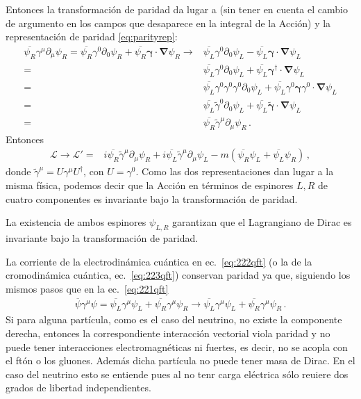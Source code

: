 Entonces la transformación de paridad da lugar a (sin tener en cuenta el cambio de argumento en los campos que desaparece en la integral de la Acción) y la representación de paridad \eqref{eq:parityrep}:
\begin{align}
  \overline{\psi_R}\gamma^\mu\partial_\mu\psi_R=\overline{\psi_R}\gamma^0\partial_0\psi_R+\overline{\psi_R}\boldsymbol{\gamma}\cdot\boldsymbol{\nabla}\psi_R 
\to&\overline{\psi_L}\gamma^0\partial_0\psi_L-\overline{\psi_L}\boldsymbol{\gamma}\cdot\boldsymbol{\nabla}\psi_L\nonumber\\
=&\overline{\psi_L}\gamma^0\partial_0\psi_L+\overline{\psi_L}\boldsymbol{\gamma}^\dagger\cdot\boldsymbol{\nabla}\psi_L\nonumber\\
=&\overline{\psi_L}\gamma^0\gamma^0\gamma^0\partial_0\psi_L+\overline{\psi_L}\gamma^0\boldsymbol{\gamma}\gamma^0\cdot\boldsymbol{\nabla}\psi_L\nonumber\\
=&\overline{\psi_L}\tilde\gamma^0\partial_0\psi_L+\overline{\psi_L}\tilde{\boldsymbol{\gamma}}\cdot\boldsymbol{\nabla}\psi_L\nonumber\\
=&\overline{\psi_R}\tilde\gamma^\mu\partial_\mu\psi_R\,.
\end{align}
Entonces
\begin{align}
   \mathcal{L}\to\mathcal{L}'=&i\overline{\psi_R}\tilde\gamma^\mu\partial_\mu\psi_R+i\overline{\psi_L}\tilde\gamma^\mu\partial_\mu\psi_L-m(\overline{\psi_R}\psi_L+\overline{\psi_L}\psi_R)\,,
\end{align}
donde $\tilde\gamma^\mu=U\gamma^\mu U^\dagger$, con $U=\gamma^0$. Como las dos representaciones dan lugar a la misma física, podemos decir que la Acción en términos de espinores $L,R$ de cuatro componentes es invariante bajo la transformación de paridad.

La existencia de ambos espinores $\psi_{L,R}$ garantizan que el Lagrangiano de Dirac es invariante bajo la transformación de paridad. 

La corriente de la electrodinámica cuántica en ec.~\eqref{eq:222qft} (o la de la cromodinámica cuántica, ec.~\eqref{eq:223qft}) conservan paridad ya que, siguiendo los mismos pasos que en la ec.~\eqref{eq:221qft}
\begin{align}
  \label{eq:224qft}
  \overline{\psi}\gamma^\mu\psi=\overline{\psi_L}\gamma^\mu\psi_L+\overline{\psi_R}\gamma^\mu\psi_R\to\overline{\psi_L}\gamma^\mu\psi_L+\overline{\psi_R}\gamma^\mu\psi_R\,.
\end{align}
Si para alguna partícula, como es el caso del neutrino, no existe la componente derecha, entonces la correspondiente interacción vectorial viola paridad y no puede tener interacciones electromagnéticas ni fuertes, es decir, no se acopla con el ftón o los gluones. Además dicha partícula no puede tener masa de Dirac. En el caso del neutrino esto se entiende pues al no tenr carga eléctrica sólo reuiere dos grados de libertad independientes.

